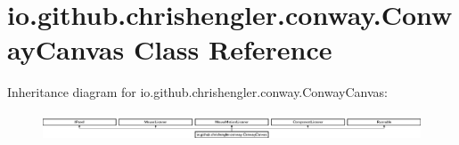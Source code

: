 \hypertarget{classio_1_1github_1_1chrishengler_1_1conway_1_1_conway_canvas}{}\section{io.\+github.\+chrishengler.\+conway.\+Conway\+Canvas Class Reference}
\label{classio_1_1github_1_1chrishengler_1_1conway_1_1_conway_canvas}
Inheritance diagram for io.\+github.\+chrishengler.\+conway.\+Conway\+Canvas\+:\begin{figure}[H]
\begin{center}
\leavevmode
\includegraphics[height=0.788732cm]{classio_1_1github_1_1chrishengler_1_1conway_1_1_conway_canvas}
\end{center}
\end{figure}
